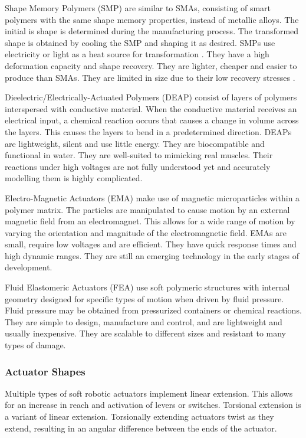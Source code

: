 Shape Memory Polymers (SMP) are similar to SMAs, consisting of smart polymers with the same shape memory properties, instead of metallic alloys. The initial is shape is determined during the manufacturing process. The transformed shape is obtained by cooling the SMP and shaping it as desired. SMPs use electricity or light as a heat source for transformation \cite{Behl2007}. They have a high deformation capacity and shape recovery. They are lighter, cheaper and easier to produce than SMAs. They are limited in size due to their low recovery stresses \cite{Rodriguez2016, Behl2007}.

Dieelectric/Electrically-Actuated Polymers (DEAP) consist of layers of polymers interspersed with conductive material. When the conductive material receives an electrical input, a chemical reaction occurs that causes a change in volume across the layers. This causes the layers to bend in a predetermined direction. DEAPs are lightweight, silent and use little energy. They are biocompatible and functional in water. They are well-suited to mimicking real muscles. Their reactions under high voltages are not fully understood yet and accurately modelling them is highly complicated. \cite{Mutlu2014}

Electro-Magnetic Actuators (EMA) make use of magnetic microparticles within a polymer matrix. The particles are manipulated to cause motion by an external magnetic field from an electromagnet. This allows for a wide range of motion by varying the orientation and magnitude of the electromagnetic field. EMAs are small, require low voltages and are efficient. They have quick response times and high dynamic ranges. They are still an emerging technology in the early stages of development. \cite{Do2018}

Fluid Elastomeric Actuators (FEA) use soft polymeric structures with internal geometry designed for specific types of motion when driven by fluid pressure. Fluid pressure may be obtained from pressurized containers or chemical reactions. They are simple to design, manufacture and control, and are lightweight and usually inexpensive. They are scalable to different sizes and resistant to many types of damage. \cite{Shepherd2011,Onal2017}

\subsubsection{Actuator Shapes}

Multiple types of soft robotic actuators implement linear extension. This allows for an increase in reach and activation of levers or switches. Torsional extension is a variant of linear extension. Torsionally extending actuators twist as they extend, resulting in an angular difference between the ends of the actuator. \cite{Whitesides2018}


